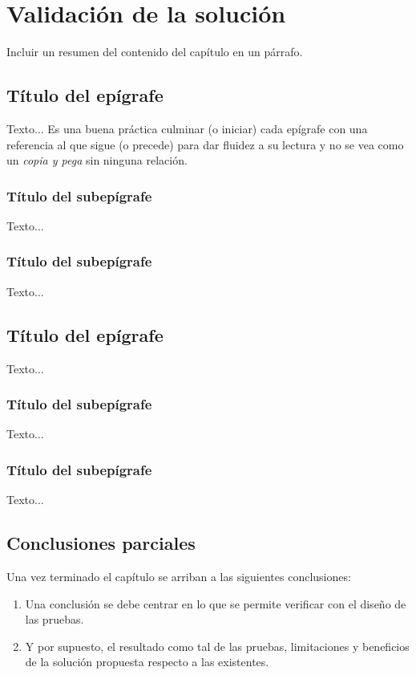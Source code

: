 \chapter{Validación de la solución}\label{chap:3}
Incluir un resumen del contenido del capítulo en un párrafo.\\

\section{Título del epígrafe}

Texto... Es una buena práctica culminar (o iniciar) cada epígrafe con una referencia al que sigue (o precede) para dar fluidez a su lectura y no se vea como un \emph{copia y pega} sin ninguna relación.

\subsection{Título del subepígrafe}

Texto...

\subsection{Título del subepígrafe}

Texto...

\section{Título del epígrafe}

Texto...

\subsection{Título del subepígrafe}

Texto...

\subsection{Título del subepígrafe}

Texto...

\section{Conclusiones parciales}


Una vez terminado el capítulo se arriban a las siguientes conclusiones:

\begin{enumerate}
	\setlength\itemsep{0em}
	\item Una conclusión se debe centrar en lo que se permite verificar con el diseño de las pruebas.
	\item Y por supuesto, el resultado como tal de las pruebas, limitaciones y beneficios de la solución propuesta respecto a las existentes.	
\end{enumerate}
\pagebreak
